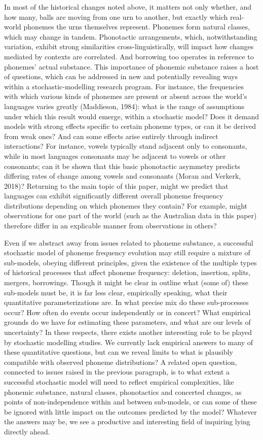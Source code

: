 In most of the historical changes noted above, it matters not only whether, and how many, balls are moving from one urn to another, but exactly which real-world phonemes the urns themselves represent. Phonemes form natural classes, which may change in tandem. Phonotactic arrangements, which, notwithstanding variation, exhibit strong similarities cross-linguistically, will impact how changes mediated by contexts are correlated. And borrowing too operates in reference to phonemes' actual substance. This importance of phonemic substance raises a host of questions, which can be addressed in new and potentially revealing ways within a stochastic-modelling research program. For instance, the frequencies with which various kinds of phonemes are present or absent across the world's languages varies greatly (Maddieson, 1984): what is the range of assumptions under which this result would emerge, within a stochastic model? Does it demand models with strong effects specific to certain phoneme types, or can it be derived from weak ones? And can some effects arise entirely through indirect interactions? For instance, vowels typically stand adjacent only to consonants, while in most languages consonants may be adjacent to vowels or other consonants; can it be shown that this basic phonotactic asymmetry predicts differing rates of change among vowels and consonants (Moran and Verkerk, 2018)? Returning to the main topic of this paper, might we predict that languages can exhibit significantly different overall phoneme frequency distributions depending on which phonemes they contain? For example, might observations for one part of the world (such as the Australian data in this paper) therefore differ in an explicable manner from observations in others?

Even if we abstract away from issues related to phoneme substance, a successful stochastic model of phoneme frequency evolution may still require a mixture of sub-models, obeying different principles, given the existence of the multiple types of historical processes that affect phoneme frequency: deletion, insertion, splits, mergers, borrowings. Though it might be clear in outline what (some of) these sub-models must be, it is far less clear, empirically speaking, what their quantitative parameterizations are. In what precise mix do these sub-processes occur? How often do events occur independently or in concert? What empirical grounds do we have for estimating these parameters, and what are our levels of uncertainty? In these respects, there exists another interesting role to be played by stochastic modelling studies. We currently lack empirical answers to many of these quantitative questions, but can we reveal limits to what is plausibly compatible with observed phoneme distributions? A related open question, connected to issues raised in the previous paragraph, is to what extent a successful stochastic model will need to reflect empirical complexities, like phonemic substance, natural classes, phonotactics and concerted changes, as points of non-independence within and between sub-models, or can some of these be ignored with little impact on the outcomes predicted by the model? Whatever the answers may be, we see a productive and interesting field of inquiring lying directly ahead.

